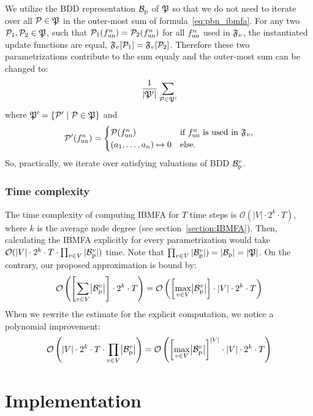 \documentclass[
	digital, oneside, nosansbold, nocolorbold, nolot, nolof
]{fithesis4}
\theoremstyle{definition}
\theoremstyle{definition}
\DeclarePairedDelimiter{\set}{\{}{\}}
\DeclarePairedDelimiter{\card}{|}{|}
\begin{document}
We utilize the BDD representation $\mathcal{B}_{\text{p}}$ of $\mathfrak{P}$ so that we do
not need to iterate over all $\mathcal{P} \in \mathfrak{P}$ in the outer-most
sum of formula~\ref{eq:pbn_ibmfa}. For any two $\mathcal{P}_1, \mathcal{P}_2 \in
\mathfrak{P}$, such that $\mathcal{P}_1(f_{\textrm{un}}^n) = \mathcal{P}_2(f_{\textrm{un}}^n)$ for
all $f_{\textrm{un}}^n$ used in $\mathfrak{F}_v$, the instantiated update functions
are equal, $\mathfrak{F}_v[\mathcal{P}_1] = \mathfrak{F}_v[\mathcal{P}_2]$. Therefore
these two parametrizations contribute to the sum equaly and the outer-most
sum can be changed to:
\[
    \frac{1}{|\mathfrak{P}'|} \sum_{\mathcal{P} \in \mathfrak{P}'}
\]
where $\paronset{P}' = \set{\paron{P}' \mid \paron{P} \in \paronset{P}}$ and
\[
    \mathcal{P}'(f_{\textrm{un}}^n) =
        \begin{cases}
            \mathcal{P}(f_{\textrm{un}}^n) &
                \text{if } f_{\textrm{un}}^n \text{ is used in } \mathfrak{F}_v,\\
            (a_1, \ldots, a_n) \mapsto 0 & \text{else}.
        \end{cases}
\]
So, practically, we iterate over satisfying valuations of BDD $\mathcal{B}_{\text{p}}^v$.

\subsection{Time complexity}

The time complexity of computing IBMFA for $T$ time steps is $\mathcal{O}(|V|
\cdot 2^k \cdot T)$, where $k$ is the average node degree (see section~\ref{section:IBMFA}).
Then, calculating the IBMFA explicitly for every parametrization would take
$\mathcal{O}(|V| \cdot 2^k \cdot T \cdot \prod_{v \in V} |\mathcal{B}_{\text{p}}^v|)$
time. Note that $\prod_{v \in V} |\mathcal{B}_{\text{p}}^v|) = |\mathcal{B}_{\text{p}}| =
|\mathfrak{P}|$. On the contrary, our proposed approximation is bound by:
\[
\mathcal{O}\left(\left[\sum_{v \in V} \card*{\bddp{B}^v}\right]
    \cdot 2^k \cdot T\right)
= \mathcal{O}\left(\left[\max_{v \in V} \card*{\bddp{B}^v}\right]
    \cdot |V| \cdot 2^k \cdot T \right)
\]
When we rewrite the estimate for the explicit computation, we notice
a polynomial improvement:
\[
\mathcal{O}\left(|V| \cdot 2^k \cdot T \cdot
    \prod_{v \in V} \card*{\bddp{B}^v}\right)
= \mathcal{O}\left(\left[\max_{v \in V} \card*{\bddp{B}^v}\right]^{|V|}
    \cdot |V| \cdot 2^k \cdot T\right)
\]


\chapter{Implementation}
\end{document}
